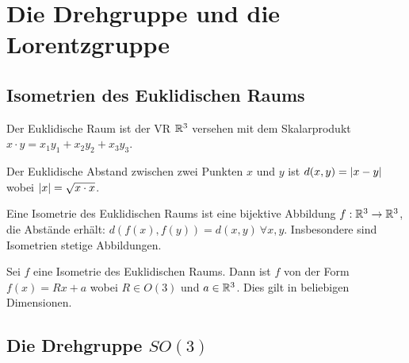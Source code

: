 \section{Die Drehgruppe und die Lorentzgruppe}

\subsection{Isometrien des Euklidischen Raums}

\begin{definition}
    Der Euklidische Raum ist der VR $\mathbb{R}^3$ versehen mit dem Skalarprodukt
    $x \cdot y = x_1 y_1 + x_2 y_2 + x_3 y_3$.
\end{definition}

\begin{definition}
    Der Euklidische Abstand zwischen zwei Punkten $x$ und $y$ ist
    $d(x,y) = \left\vert x - y \right\vert$ wobei $\left\vert x \right\vert = \sqrt{x \cdot x}$.
\end{definition}

\begin{definition}[Isometrie]
    Eine Isometrie des Euklidischen Raums ist eine bijektive Abbildung
    $f: \mathbb{R}^3 \rightarrow \mathbb{R}^3$, die Abstände erhält: $d(f(x),f(y)) = d(x,y)
    \ \forall x,y$. Insbesondere sind Isometrien stetige Abbildungen.
\end{definition}

\begin{satz}
    Sei $f$ eine Isometrie des Euklidischen Raums. Dann ist $f$ von der Form
    $f(x) = R x + a$ wobei $R \in O(3)$ und $a \in \mathbb{R}^3$. Dies gilt in
    beliebigen Dimensionen.
\end{satz}

\subsection{Die Drehgruppe $SO(3)$}

